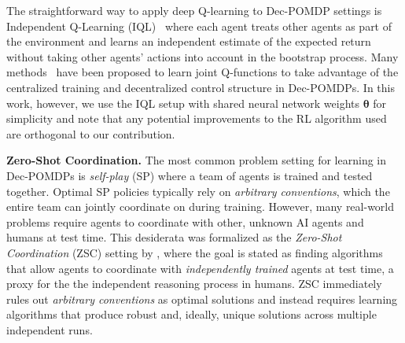 The straightforward way to apply deep Q-learning to Dec-POMDP settings is Independent Q-Learning (IQL)~\citep{tan93multi} where each agent treats other agents as part of the environment and learns an independent estimate of the expected return without taking other agents' actions into account in the bootstrap process. Many methods~\citep{vdn, qmix} have been proposed to learn joint Q-functions to take advantage of the centralized training and decentralized control structure in Dec-POMDPs. In this work, however, we use the IQL setup with shared neural network weights $\bm{\theta}$ for simplicity and note that any potential improvements to the RL algorithm used are orthogonal to our contribution. 


\textbf{Zero-Shot Coordination.} The most common problem setting for learning in Dec-POMDPs is \emph{self-play} (SP) where a team of agents is trained and tested together. Optimal SP policies typically rely on \emph{arbitrary conventions}, which the entire team can jointly coordinate on during training. However, many real-world problems require agents to coordinate with other, unknown AI agents and humans at test time.
This desiderata was formalized as the \emph{Zero-Shot Coordination} (ZSC) setting by \citet{hu2020other}, where the goal is stated as finding algorithms that allow agents to coordinate with \emph{independently trained} agents at test time, a proxy for the the independent reasoning process in humans. ZSC immediately rules out \emph{arbitrary conventions} as optimal solutions and instead requires learning algorithms that produce robust and, ideally, unique solutions across multiple independent runs. 

